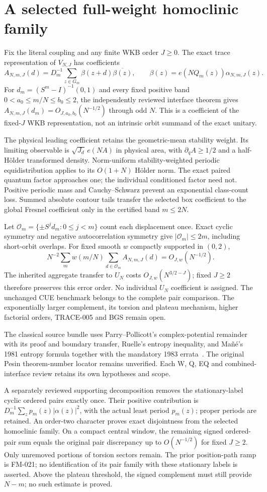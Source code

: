 \section{A selected full-weight homoclinic family}
Fix the literal coupling and any finite WKB order $J\ge0$. The exact trace
representation of $V_{N,J}$ has coefficients
\[
 A_{N,m,J}(d)=D_m^{-1}\sum_{z\in G_m}\beta(z+d)\overline{\beta(z)},
 \qquad \beta(z)=e(NQ_m(z))\alpha_{N,m,J}(z).
\]
For $d_m=(S^m-I)^{-1}(0,1)$ and every fixed positive band
$0<a_0\le m/N\le b_0\le2$, the independently reviewed interface theorem gives
$A_{N,m,J}(d_m)=O_{J,a_0,b_0}(N^{-1/2})$ through odd $N$.
This is a coefficient of the fixed-$J$ WKB representation, not an intrinsic
orbit summand of the exact unitary.

The physical leading coefficient retains the geometric-mean stability weight.
Its limiting observable is $\sqrt{J_d}\,e(NA)$ in physical area, with
$\partial_qA\ge1/2$ and a half-H\"older transformed density.
Norm-uniform stability-weighted periodic equidistribution applies to its
$O(1+N)$ H\"older norm. The exact paired quantum factor approaches one;
the individual conditioned factor need not. Positive periodic mass and
Cauchy--Schwarz prevent an exponential class-count loss. Summed absolute
contour tails transfer the selected box coefficient to the global Fresnel
coefficient only in the certified band $m\le2N$.

Let $\mathcal O_m=\{\pm S^jd_m:0\le j<m\}$ count each displacement once.
Exact cyclic symmetry and negative autocorrelation symmetry give
$|\mathcal O_m|\le2m$, including short-orbit overlaps. For fixed smooth
$w$ compactly supported in $(0,2)$,
\[
 N^{-2}\sum_m w(m/N)\sum_{d\in\mathcal O_m}A_{N,m,J}(d)
 =O_{J,w}(N^{-1/2}).
\]
The inherited aggregate transfer to $U_N$ costs $O_{J,w}(N^{3/2-J})$;
fixed $J\ge2$ therefore preserves this error order. No individual $U_N$
coefficient is assigned. The unchanged CUE benchmark belongs to the complete
pair comparison. The exponentially larger complement, its torsion and
plateau mechanism, higher factorial orders, TRACE-005 and BGS remain open.

The classical source bundle uses Parry--Pollicott's complex-potential
remainder with its proof and boundary transfer, Ruelle's entropy inequality,
and Ma\~n\'e's 1981 entropy formula together with the mandatory 1983 errata~\cite{Mane1981,Mane1983Errata}.
The original Pesin theorem-number locator remains unverified. Each W, Q, EQ
and combined-interface review retains its own hypotheses and scope.


A separately reviewed supporting decomposition removes the stationary-label
cyclic ordered pairs exactly once. Their positive contribution is
$D_m^{-1}\sum_z p_m(z)|\alpha(z)|^2$, with the actual least period $p_m(z)$;
proper periods are retained. An order-two character proves exact disjointness
from the selected homoclinic family. On a compact central window, the remaining
signed ordered-pair sum equals the original pair discrepancy up to
$O(N^{-1/2})$ for fixed $J\ge2$. Only unremoved portions of torsion sectors
remain. The prior position-path ramp is FM-021; no identification of its pair
family with these stationary labels is asserted. Above the plateau threshold,
the signed complement must still provide $N-m$; no such estimate is proved.
